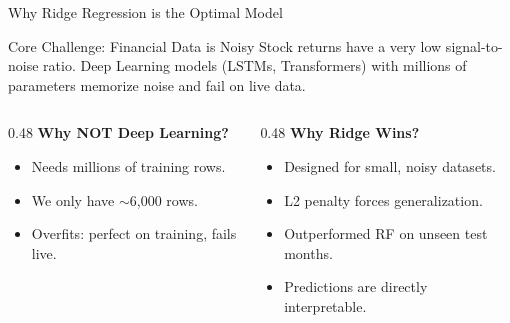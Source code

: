 \documentclass[aspectratio=169, 10pt]{beamer}
\begin{document}
\begin{frame}{Why Ridge Regression is the Optimal Model}
    \begin{block}{Core Challenge: Financial Data is Noisy}
        \small Stock returns have a very low signal-to-noise ratio. Deep Learning models (LSTMs, Transformers) with millions of parameters memorize noise and fail on live data.
    \end{block}
    \vspace{0.3em}
    \begin{columns}[T]
        \begin{column}{0.48\textwidth}
            \textbf{Why NOT Deep Learning?}
            \begin{itemize}
                \item Needs millions of training rows.
                \item We only have $\sim$6,000 rows.
                \item Overfits: perfect on training, fails live.
            \end{itemize}
        \end{column}
        \begin{column}{0.48\textwidth}
            \textbf{Why Ridge Wins?}
            \begin{itemize}
                \item Designed for small, noisy datasets.
                \item L2 penalty forces generalization.
                \item Outperformed RF on unseen test months.
                \item Predictions are directly interpretable.
            \end{itemize}
        \end{column}
    \end{columns}
\end{frame}

\end{document}
